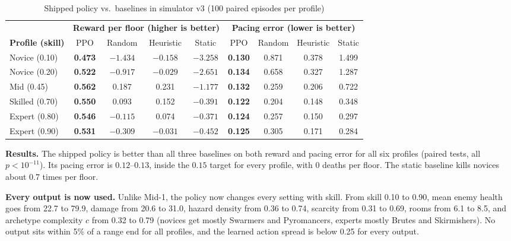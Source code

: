 \begin{table}[!htbp]
\centering
\caption{Shipped policy vs.\ baselines in simulator v3 (100 paired episodes per profile)}
\label{tab:policy_eval}
\scriptsize
\begin{tabular}{lcccccccc}
\toprule
& \multicolumn{4}{c}{\textbf{Reward per floor (higher is better)}} & \multicolumn{4}{c}{\textbf{Pacing error (lower is better)}} \\
\cmidrule(lr){2-5}\cmidrule(lr){6-9}
\textbf{Profile (skill)} & PPO & Random & Heuristic & Static & PPO & Random & Heuristic & Static \\
\midrule
Novice (0.10) & \textbf{0.473} & $-1.434$ & $-0.158$ & $-3.258$ & \textbf{0.130} & 0.871 & 0.378 & 1.499 \\
Novice (0.20) & \textbf{0.522} & $-0.917$ & $-0.029$ & $-2.651$ & \textbf{0.134} & 0.658 & 0.327 & 1.287 \\
Mid (0.45) & \textbf{0.562} & 0.187 & 0.231 & $-1.177$ & \textbf{0.132} & 0.259 & 0.206 & 0.722 \\
Skilled (0.70) & \textbf{0.550} & 0.093 & 0.152 & $-0.391$ & \textbf{0.122} & 0.204 & 0.148 & 0.348 \\
Expert (0.80) & \textbf{0.546} & $-0.115$ & 0.074 & $-0.371$ & \textbf{0.124} & 0.257 & 0.150 & 0.297 \\
Expert (0.90) & \textbf{0.531} & $-0.309$ & $-0.031$ & $-0.452$ & \textbf{0.125} & 0.305 & 0.171 & 0.284 \\
\bottomrule
\end{tabular}
\end{table}

\textbf{Results.} The shipped policy is better than all three baselines on both reward and pacing error for all six profiles (paired tests, all $p < 10^{-11}$). Its pacing error is $0.12$--$0.13$, inside the $0.15$ target for every profile, with 0 deaths per floor. The static baseline kills novices about 0.7 times per floor.

\textbf{Every output is now used.} Unlike Mid-1, the policy now changes every setting with skill. From skill 0.10 to 0.90, mean enemy health goes from 22.7 to 79.9, damage from 20.6 to 31.0, hazard density from 0.36 to 0.74, scarcity from 0.31 to 0.69, rooms from 6.1 to 8.5, and archetype complexity $c$ from 0.32 to 0.79 (novices get mostly Swarmers and Pyromancers, experts mostly Brutes and Skirmishers). No output sits within 5\% of a range end for all profiles, and the learned action spread is below 0.25 for every output.

